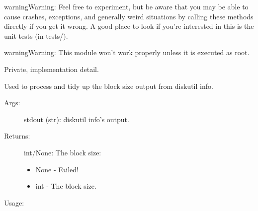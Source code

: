 \documentclass[letterpaper,10pt,english]{sphinxmanual}
\begin{document}
\begin{sphinxadmonition}{warning}{Warning:}
Feel free to experiment, but be aware that you may be able to cause
crashes, exceptions, and generally weird situations by calling
these methods directly if you get it wrong. A good place to
look if you’re interested in this is the unit tests (in tests/).
\end{sphinxadmonition}

\begin{sphinxadmonition}{warning}{Warning:}
This module won’t work properly unless it is executed as root.
\end{sphinxadmonition}

\begin{fulllineitems}
\label{\detokenize{macos:getdevinfo.macos.compute_block_size}}
Private, implementation detail.

Used to process and tidy up the block size output from diskutil info.
\begin{description}
\item[{Args:}] \leavevmode
stdout (str):       diskutil info’s output.

\item[{Returns:}] \leavevmode
int/None: The block size:
\begin{itemize}
\item {} 
None - Failed!

\item {} 
int  - The block size.

\end{itemize}

\end{description}

Usage:

\begin{sphinxVerbatim}[commandchars=\\\{\}]
\end{sphinxVerbatim}

\end{fulllineitems}

\end{document}
